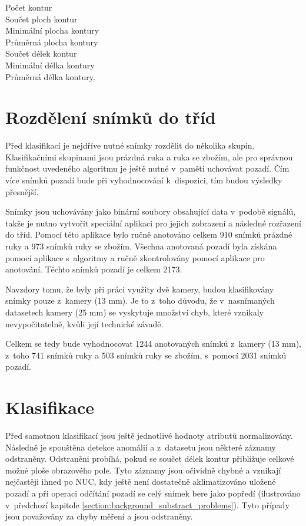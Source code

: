 \begin{description}
\item [Počet kontur]
\item [Součet ploch kontur]
\item [Minimální plocha kontury]
\item [Průměrná plocha kontury]
\item [Součet délek kontur]
\item [Minimální délka kontury]
\item [Průměrná délka kontury.]
\end{description}


\section{Rozdělení snímků do tříd}
Před klasifikací je nejdříve nutné snímky rozdělit do několika skupin. Klasifikačními skupinami jsou prázdná ruka a ruka se zbožím, ale pro správnou funkčnost uvedeného algoritmu je ještě nutné v~paměti uchovávat pozadí. Čím více snímků pozadí bude při vyhodnocování k~dispozici, tím budou výsledky přesnější.

Snímky jsou uchovávány jako binární soubory obsahující data v~podobě signálů, takže je nutno vytvořit speciální aplikaci pro jejich zobrazení a následné rozřazení do tříd. Pomocí této aplikace bylo ručně anotováno celkem 910 snímků prázdné ruky a 973 snímků ruky se zbožím. Všechna anotovaná pozadí byla získána pomocí aplikace s~algoritmy a ručně zkontrolovány pomocí aplikace pro anotování. Těchto snímků pozadí je celkem 2173.

Navzdory tomu, že byly při práci využity dvě kamery, budou klasifikovány snímky pouze z~kamery (13 mm). Je to z~toho důvodu, že v~nasnímaných datasetech kamery (25 mm) se vyskytuje množství chyb, které vznikaly nevypočitatelně, kvůli její technické závadě. 

Celkem se tedy bude vyhodnocovat 1244 anotovaných snímků z~kamery (13 mm), z~toho 741 snímků ruky a 503 snímků ruky se zbožím, s~pomocí 2031 snímků pozadí.


\section{Klasifikace}
Před samotnou klasifikací jsou ještě jednotlivé hodnoty atributů normalizovány. Následně je spouštěna detekce anomálií a z~datasetu jsou některé záznamy odstraněny. Odstraněni probíhá, pokud se součet délek kontur přibližuje celkové možné ploše obrazového pole. Tyto záznamy jsou očividně chybné a vznikají nejčastěji ihned po NUC, kdy ještě není dostatečně aklimatizováno uložené pozadí a při operaci odčítání pozadí se celý snímek bere jako popředí (ilustrováno v~předchozí kapitole \ref{section:background_substract_problems}). Tyto případy jsou považovány za chyby měření a jsou odstraněny.

